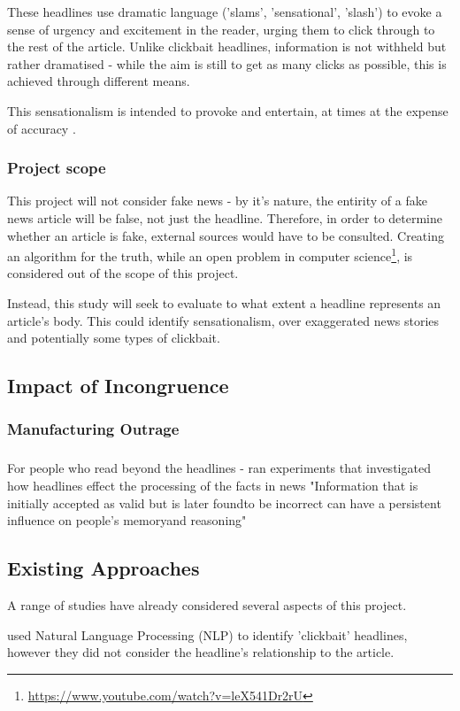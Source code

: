 These headlines use dramatic language ('slams', 'sensational', 'slash') to evoke a sense of urgency and excitement in the reader, urging them to click through to the rest of the article. Unlike clickbait headlines, information is not withheld but rather dramatised - while the aim is still to get as many clicks as possible, this is achieved through different means.

This sensationalism is intended to provoke and entertain, at times at the expense of accuracy \cite{chesney2017}.

\subsubsection{Project scope}
This project will not consider fake news - by it's nature, the entirity of a fake news article will be false, not just the headline. Therefore, in order to determine whether an article is fake, external sources would have to be consulted. Creating an algorithm for the truth, while an open problem in computer science\footnote{\url{https://www.youtube.com/watch?v=leX541Dr2rU}}, is considered out of the scope of this project.

Instead, this study will seek to evaluate to what extent a headline represents an article's body. This could identify sensationalism, over exaggerated news stories and potentially some types of clickbait.

\subsection{Impact of Incongruence}
\subsubsection{Manufacturing Outrage}
\subsubsection{}
For people who read beyond the headlines -  ran experiments that investigated how headlines effect the processing of the facts in news "Information that is initially accepted as valid but is later foundto be incorrect can have a persistent influence on people’s memoryand reasoning"


\subsection{Existing Approaches}
A range of studies have already considered several aspects of this project.

 used Natural Language Processing (NLP) to identify 'clickbait' headlines, however they did not consider the headline's relationship to the article.


